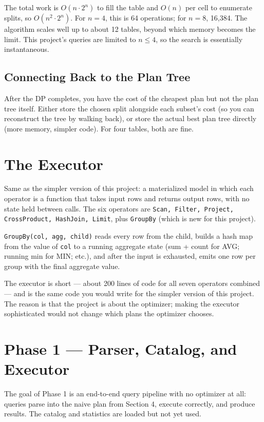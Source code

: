 \documentclass[11pt,a4paper]{article}
\begin{document}
The total work is $O(n \cdot 2^n)$ to fill the table and $O(n)$ per cell to enumerate splits, so $O(n^2 \cdot 2^n)$. For $n = 4$, this is 64 operations; for $n = 8$, 16{,}384. The algorithm scales well up to about 12 tables, beyond which memory becomes the limit. This project's queries are limited to $n \leq 4$, so the search is essentially instantaneous.

\subsection{Connecting Back to the Plan Tree}
After the DP completes, you have the cost of the cheapest plan but not the plan tree itself. Either store the chosen split alongside each subset's cost (so you can reconstruct the tree by walking back), or store the actual best plan tree directly (more memory, simpler code). For four tables, both are fine.

\section{The Executor}

Same as the simpler version of this project: a materialized model in which each operator is a function that takes input rows and returns output rows, with no state held between calls. The six operators are \texttt{Scan, Filter, Project, CrossProduct, HashJoin, Limit}, plus \texttt{GroupBy} (which is new for this project).

\texttt{GroupBy(col, agg, child)} reads every row from the child, builds a hash map from the value of \texttt{col} to a running aggregate state (sum + count for AVG; running min for MIN; etc.), and after the input is exhausted, emits one row per group with the final aggregate value.

The executor is short --- about 200 lines of code for all seven operators combined --- and is the same code you would write for the simpler version of this project. The reason is that the project is about the optimizer; making the executor sophisticated would not change which plans the optimizer chooses.

\section{Phase 1 --- Parser, Catalog, and Executor}

The goal of Phase 1 is an end-to-end query pipeline with no optimizer at all: queries parse into the naive plan from Section 4, execute correctly, and produce results. The catalog and statistics are loaded but not yet used.
\end{document}
